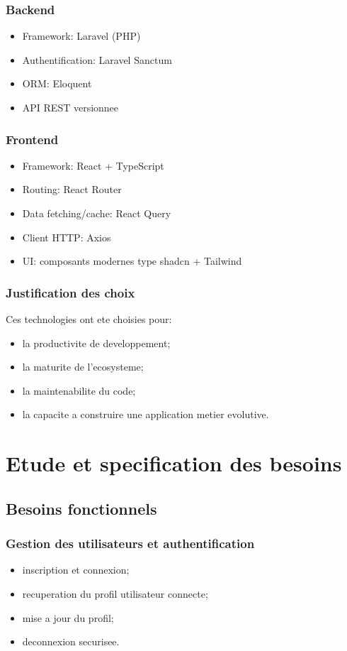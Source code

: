 \documentclass[12pt,a4paper,oneside]{report}
\begin{document}
\subsection{Backend}
\begin{itemize}[leftmargin=1.2cm]
  \item Framework: Laravel (PHP)
  \item Authentification: Laravel Sanctum
  \item ORM: Eloquent
  \item API REST versionnee
\end{itemize}

\subsection{Frontend}
\begin{itemize}[leftmargin=1.2cm]
  \item Framework: React + TypeScript
  \item Routing: React Router
  \item Data fetching/cache: React Query
  \item Client HTTP: Axios
  \item UI: composants modernes type shadcn + Tailwind
\end{itemize}

\subsection{Justification des choix}
Ces technologies ont ete choisies pour:
\begin{itemize}[leftmargin=1.2cm]
  \item la productivite de developpement;
  \item la maturite de l'ecosysteme;
  \item la maintenabilite du code;
  \item la capacite a construire une application metier evolutive.
\end{itemize}

\chapter{Etude et specification des besoins}

\section{Besoins fonctionnels}
\subsection{Gestion des utilisateurs et authentification}
\begin{itemize}[leftmargin=1.2cm]
  \item inscription et connexion;
  \item recuperation du profil utilisateur connecte;
  \item mise a jour du profil;
  \item deconnexion securisee.
\end{itemize}
\end{document}
